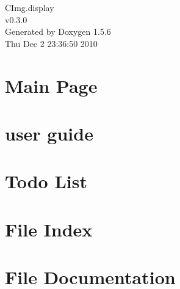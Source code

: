 \documentclass[a4paper]{book}
\begin{document}
\begin{titlepage}
\vspace*{7cm}
\begin{center}
{\Large CImg.display \\[1ex]\large v0.3.0 }\\
\vspace*{1cm}
{\large Generated by Doxygen 1.5.6}\\
\vspace*{0.5cm}
{\small Thu Dec 2 23:36:50 2010}\\
\end{center}
\end{titlepage}
\clearemptydoublepage
{}
\tableofcontents
\clearemptydoublepage
{}
\chapter{Main Page}
\label{index}\hypertarget{index}{}
\chapter{user guide}
\label{user}
\hypertarget{user}{}

\chapter{Todo List}
\label{todo}
\hypertarget{todo}{}

\chapter{File Index}

\chapter{File Documentation}

\printindex
\end{document}
